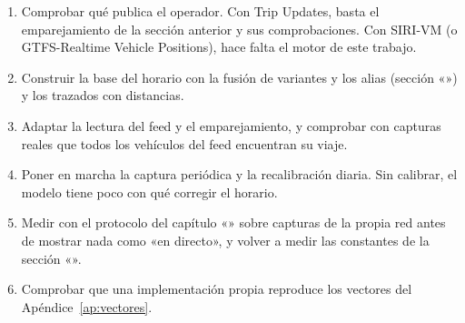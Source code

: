 \begin{enumerate}
  \item Comprobar qué publica el operador. Con Trip Updates, basta el emparejamiento de la sección anterior y sus
        comprobaciones. Con SIRI-VM
        (o GTFS-Realtime Vehicle Positions), hace falta el motor de este trabajo.
  \item Construir la base del horario con la fusión de variantes y los alias (sección «») y los trazados
        con distancias.
  \item Adaptar la lectura del feed y el emparejamiento, y comprobar con capturas reales que todos los vehículos del
        feed encuentran su viaje.
  \item Poner en marcha la captura periódica y la recalibración diaria. Sin calibrar, el modelo tiene poco con qué
        corregir el horario.
  \item Medir con el protocolo del capítulo «» sobre capturas de la propia red antes de mostrar
        nada como «en directo», y volver a medir las constantes de la sección «».
  \item Comprobar que una implementación propia reproduce los vectores del Apéndice~\ref{ap:vectores}.
\end{enumerate}
